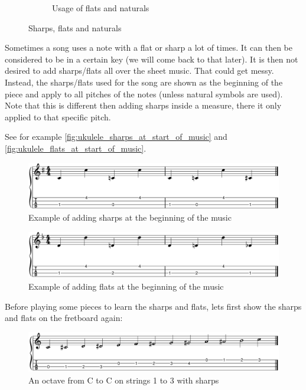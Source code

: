 \begin{figure}[h]
\begin{subfigure}[b]{0.45\textwidth}
		\caption{Usage of flats and naturals}
		\label{fig:ukulele_usage_of_flats_and_naturals}
	\end{subfigure}
	\caption{Sharps, flats and naturals}
\end{figure}

Sometimes a song uses a note with a flat or sharp a lot of times. It can then be considered to be in a certain key (we will come back to that later). It is then not desired to add sharps/flats all over the sheet music. That could get messy. Instead, the sharps/flats used for the song are shown as the beginning of the piece and apply to all pitches of the notes (unless natural symbols are used). Note that this is different then adding sharps inside a measure, there it only applied to that specific pitch.

See for example \autoref{fig:ukulele_sharps_at_start_of_music} and \autoref{fig:ukulele_flats_at_start_of_music}.

\begin{figure}[h]
	\centering
	\includegraphics[width=\textwidth]{../../MuseScore/Ukulele/UkuleleKeySharpExample.png}
	\caption{Example of adding sharps at the beginning of the music}
	\label{fig:ukulele_sharps_at_start_of_music}
\end{figure}

\begin{figure}[h]
	\centering
	\includegraphics[width=\textwidth]{../../MuseScore/Ukulele/UkuleleKeyFlatExample.png}
	\caption{Example of adding flats at the beginning of the music}
	\label{fig:ukulele_flats_at_start_of_music}
\end{figure}

\newpage

Before playing some pieces to learn the sharps and flats, lets first show the sharps and flats on the fretboard again:

\begin{figure}[h]
	\centering
	\includegraphics[width=\textwidth]{../../MuseScore/Ukulele/UkuleleChromaticNotesSharpsMultiString.png}
	\caption{An octave from C to C on strings 1 to 3 with sharps}
	\label{fig:ukulele_multi_string_octave_sharps_chapter_music_notation}
\end{figure}

